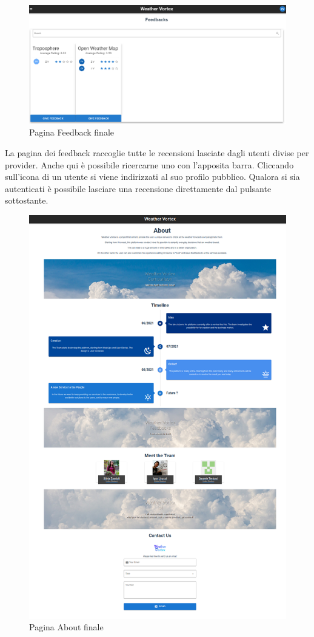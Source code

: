 \begin{figure}[H]
    \caption{Pagina Feedback finale}
    \label{fig:imFeedbacks}
    \centering
    \includegraphics[width=1\textwidth]{Images/feedback.PNG}
\end{figure}
La pagina dei feedback raccoglie tutte le recensioni lasciate dagli utenti divise per provider. Anche qui è possibile ricercarne uno con l'apposita barra. Cliccando sull'icona di un utente si viene indirizzati al suo profilo pubblico. Qualora si sia autenticati
è possibile lasciare una recensione direttamente dal pulsante sottostante.

\begin{figure}[H]
    \caption{Pagina About finale}
    \label{fig:imAbout}
    \centering
    \includegraphics[width=1\textwidth]{Images/about.PNG}
\end{figure}